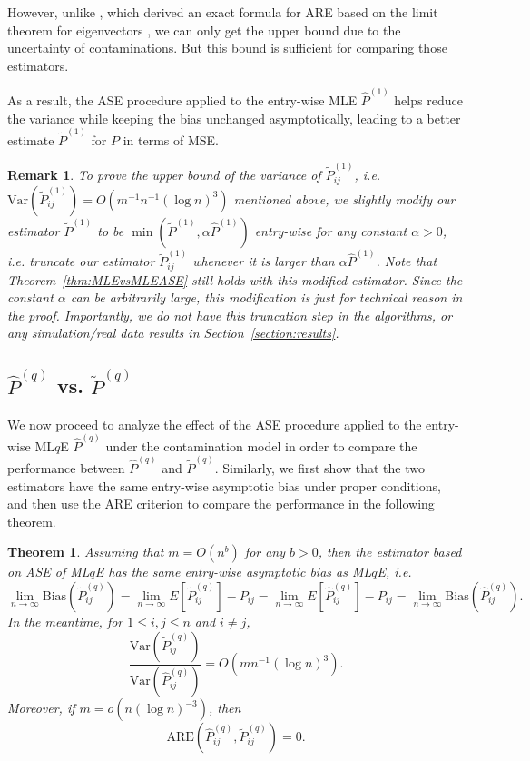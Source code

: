 \documentclass[a4paper]{article}
\newtheorem{theorem}[fact]{Theorem}
\newtheorem{remark}[fact]{Remark}
\renewcommand{\hat}{\widehat}
\begin{document}
However, unlike \citep{tang2016law}, which derived an exact formula for ARE based on the limit theorem for eigenvectors \citep{athreya2016limit}, we can only get the upper bound due to the uncertainty of contaminations. But this bound is sufficient for comparing those estimators.

As a result, the ASE procedure applied to the entry-wise MLE $\hat{P}^{(1)}$ helps reduce the variance while keeping the bias unchanged asymptotically, leading to a better estimate $\widetilde{P}^{(1)}$ for $P$ in terms of MSE.

\begin{remark}
\label{remark:var1}
To prove the upper bound of the variance of $\widetilde{P}_{ij}^{(1)}$, i.e. $\mathrm{Var}(\widetilde{P}_{ij}^{(1)}) = O(m^{-1} n^{-1} (\log n)^3)$ mentioned above, we slightly modify our estimator $\widetilde{P}^{(1)}$ to be $\min(\widetilde{P}^{(1)}, \alpha \hat{P}^{(1)})$ entry-wise for any constant $\alpha > 0$, i.e. truncate our estimator $\widetilde{P}^{(1)}_{ij}$ whenever it is larger than $\alpha \hat{P}^{(1)}$. Note that Theorem~\ref{thm:MLEvsMLEASE} still holds with this modified estimator. Since the constant $\alpha$ can be arbitrarily large, this modification is just for technical reason in the proof. Importantly, we do not have this truncation step in the algorithms, or any simulation/real data results in Section~\ref{section:results}.
\end{remark}


\subsection{$\hat{P}^{(q)}$ vs. $\widetilde{P}^{(q)}$}

We now proceed to analyze the effect of the ASE procedure applied to the entry-wise ML$q$E $\hat{P}^{(q)}$ under the contamination model in order to compare the performance between $\hat{P}^{(q)}$ and $\widetilde{P}^{(q)}$. Similarly, we first show that the two estimators have the same entry-wise asymptotic bias under proper conditions, and then use the ARE criterion to compare the performance in the following theorem.

\begin{theorem}
\label{thm:MLqEvsMLqEASE}
Assuming that $m = O(n^b)$ for any $b > 0$, then the estimator based on ASE of ML$q$E has the same entry-wise asymptotic bias as ML$q$E, i.e.
\[
	\lim_{n \to \infty} \mathrm{Bias}(\widetilde{P}_{ij}^{(q)}) = \lim_{n \to \infty} E[\widetilde{P}_{ij}^{(q)}] - P_{ij} = \lim_{n \to \infty} E[\hat{P}^{(q)}_{ij}] - P_{ij}
    = \lim_{n \to \infty} \mathrm{Bias}(\hat{P}_{ij}^{(q)}).
\]
In the meantime, for $1 \le i, j \le n$ and $i \ne j$,
\[
	\frac{\mathrm{Var}(\widetilde{P}_{ij}^{(q)})}{\mathrm{Var}(\hat{P}_{ij}^{(q)})}
    = O(m n^{-1} (\log n)^3).
\]
Moreover, if $m = o(n (\log n)^{-3})$, then
\[
	\mathrm{ARE}(\hat{P}_{ij}^{(q)}, \widetilde{P}_{ij}^{(q)}) = 0.
\]
\end{theorem}
\end{document}
